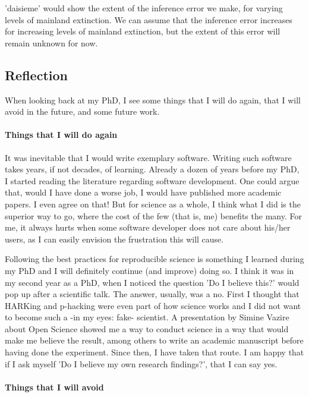 'daisieme' would show the extent of the inference error we make,
for varying levels of mainland extinction. We can assume that the inference 
error increases for increasing levels of mainland extinction, but the extent
of this error will remain unknown for now.

\subsection{Reflection}

When looking back at my PhD, I see some things that I will
do again, that I will avoid in the future, and some future work.

\paragraph{Things that I will do again} 

It was inevitable that I would write exemplary software. Writing such
software takes years, if not decades, of learning. 
Already a dozen of years before my PhD, I started reading the literature
regarding software development. One could argue that, would I have done 
a worse job, I would have published more academic papers. I even agree
on that! But for science as a whole, I think what I did is the superior
way to go, where the cost of the few (that is, me) benefits the many. 
For me, it always hurts when some software developer does not
care about his/her users, as I can easily envision the frustration 
this will cause.

Following the best practices for reproducible science is something
I learned during my PhD and I will definitely continue (and improve)
doing so. I think it was in my second year as a PhD, 
when I noticed the question 'Do I believe this?' would pop up
after a scientific talk. The answer, usually, was a no. First I thought
that HARKing and p-hacking were even part of how science works
and I did not want to become such a -in my eyes: fake- scientist.
A presentation by Simine Vazire about Open Science showed me a way
to conduct science in a way that would make me believe the result,
among others to write an academic manuscript before having done
the experiment. Since then, I have taken that route. 
I am happy that if I ask myself 'Do I believe my own research findings?', 
that I can say yes.

\paragraph{Things that I will avoid} 

